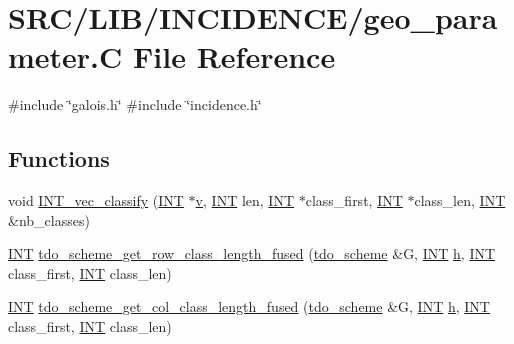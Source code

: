 \hypertarget{geo__parameter_8_c}{}\section{S\+R\+C/\+L\+I\+B/\+I\+N\+C\+I\+D\+E\+N\+C\+E/geo\+\_\+parameter.C File Reference}
\label{geo__parameter_8_c}
{\ttfamily \#include \char`\"{}galois.\+h\char`\"{}}\newline
{\ttfamily \#include \char`\"{}incidence.\+h\char`\"{}}\newline
\subsection*{Functions}
\begin{DoxyCompactItemize}
\item 
void \mbox{\hyperlink{geo__parameter_8_c_a353d92afec018f08b05faff95abcb35f}{I\+N\+T\+\_\+vec\+\_\+classify}} (\mbox{\hyperlink{galois_8h_a09fddde158a3a20bd2dcadb609de11dc}{I\+NT}} $\ast$\mbox{\hyperlink{simeon_8_c_aeb3f3030944801b163bc3b829a7f6710}{v}}, \mbox{\hyperlink{galois_8h_a09fddde158a3a20bd2dcadb609de11dc}{I\+NT}} len, \mbox{\hyperlink{galois_8h_a09fddde158a3a20bd2dcadb609de11dc}{I\+NT}} $\ast$class\+\_\+first, \mbox{\hyperlink{galois_8h_a09fddde158a3a20bd2dcadb609de11dc}{I\+NT}} $\ast$class\+\_\+len, \mbox{\hyperlink{galois_8h_a09fddde158a3a20bd2dcadb609de11dc}{I\+NT}} \&nb\+\_\+classes)
\item 
\mbox{\hyperlink{galois_8h_a09fddde158a3a20bd2dcadb609de11dc}{I\+NT}} \mbox{\hyperlink{geo__parameter_8_c_abde647e006f2bca65e5445d00c7d641b}{tdo\+\_\+scheme\+\_\+get\+\_\+row\+\_\+class\+\_\+length\+\_\+fused}} (\mbox{\hyperlink{classtdo__scheme}{tdo\+\_\+scheme}} \&G, \mbox{\hyperlink{galois_8h_a09fddde158a3a20bd2dcadb609de11dc}{I\+NT}} \mbox{\hyperlink{alphabet2_8_c_a16611451551e3d15916bae723c3f59f7}{h}}, \mbox{\hyperlink{galois_8h_a09fddde158a3a20bd2dcadb609de11dc}{I\+NT}} class\+\_\+first, \mbox{\hyperlink{galois_8h_a09fddde158a3a20bd2dcadb609de11dc}{I\+NT}} class\+\_\+len)
\item 
\mbox{\hyperlink{galois_8h_a09fddde158a3a20bd2dcadb609de11dc}{I\+NT}} \mbox{\hyperlink{geo__parameter_8_c_a55fef24fe261c2a1501bbfbf4c638d5b}{tdo\+\_\+scheme\+\_\+get\+\_\+col\+\_\+class\+\_\+length\+\_\+fused}} (\mbox{\hyperlink{classtdo__scheme}{tdo\+\_\+scheme}} \&G, \mbox{\hyperlink{galois_8h_a09fddde158a3a20bd2dcadb609de11dc}{I\+NT}} \mbox{\hyperlink{alphabet2_8_c_a16611451551e3d15916bae723c3f59f7}{h}}, \mbox{\hyperlink{galois_8h_a09fddde158a3a20bd2dcadb609de11dc}{I\+NT}} class\+\_\+first, \mbox{\hyperlink{galois_8h_a09fddde158a3a20bd2dcadb609de11dc}{I\+NT}} class\+\_\+len)
\end{DoxyCompactItemize}


